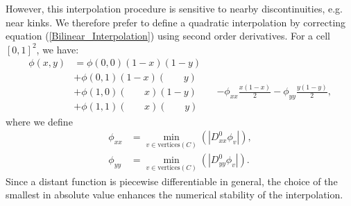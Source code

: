 \documentclass[english]{article}
\begin{document}
However, this interpolation procedure is sensitive to nearby
discontinuities, e.g. near kinks. We therefore prefer to define a quadratic
interpolation by correcting equation (\ref{Bilinear_Interpolation}) using
second order derivatives. For a cell $[0, 1]^2$, we have:
\begin{equation}
\begin{aligned}
\phi(x,y) &= \phi(0,0)(1-x)(1-y) \\
          &+ \phi(0,1)(1-x)(\quad\,\,\,\,\,y) \\
          &+ \phi(1,0)(\quad\,\,\,\,\,x)(1-y) \\
          &+ \phi(1,1)(\quad\,\,\,\,\,x)(\quad\,\,\,\,\,y)
\end{aligned}
\begin{aligned}
\\
\\
\\        &- \phi_{xx}\frac{x(1-x)}2
           - \phi_{yy}\frac{y(1-y)}2,
\end{aligned}\label{Stabilized_Interpolation1}
\end{equation}
where we define
\begin{equation}
\begin{aligned}
\phi_{xx}&=\min_{v\in \textrm{vertices}(C)}(|D^0_{xx}\phi_{v}|),\\
\phi_{yy}&=\min_{v\in \textrm{vertices}(C)}(|D^0_{yy}\phi_{v}|).
\end{aligned}\label{Stabilized_Interpolation2}
\end{equation}
Since a distant function is piecewise differentiable in general, the choice of the smallest in
absolute value enhances the numerical stability of the interpolation.


%
%
\end{document}
